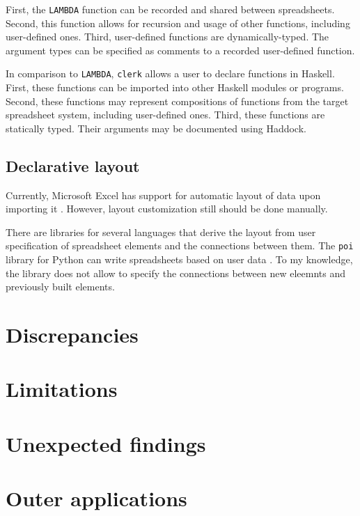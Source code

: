 First, the \texttt{LAMBDA} function can be recorded and shared between spreadsheets.
Second, this function allows for recursion and usage of other functions, including user-defined ones.
Third, user-defined functions are dynamically-typed.
The argument types can be specified as comments to a recorded user-defined function.

In comparison to \texttt{LAMBDA}, \texttt{clerk} allows a user to declare functions in Haskell.
First, these functions can be imported into other Haskell modules or programs.
Second, these functions may represent compositions of functions from the target spreadsheet system, including user-defined ones.
Third, these functions are statically typed. Their arguments may be documented using Haddock.

\subsection{Declarative layout}

Currently, Microsoft Excel has support for automatic layout of data upon importing it \cite{excel_custom_types}.
However, layout customization still should be done manually.

There are libraries for several languages that derive the layout from user specification of spreadsheet elements and the connections between them.
The \texttt{poi} library for Python can write spreadsheets based on user data \cite{wang_poi_nodate}.
To my knowledge, the library does not allow to specify the connections between new eleemnts and previously built elements.



\section{Discrepancies}
\label{eval:discrepancies}

\section{Limitations}
\label{eval:limitations}

\section{Unexpected findings}
\label{eval:unexpected}

\section{Outer applications}
\label{eval:outer-applications}



